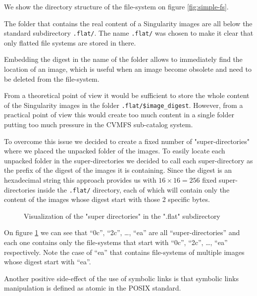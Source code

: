 We show the directory structure of the file-system on figure
\ref{fig:simple-fs}.

The folder that contains the real content of a Singularity images are all below
the standard subdirectory \texttt{.flat/}.  The name \texttt{.flat/} was chosen
to make it clear that only flatted file systems are stored in there.

Embedding the digest in the name of the folder allows to immediately find the
location of an image, which is useful when an image become obsolete and need to
be deleted from the file-system.

From a theoretical point of view it would be sufficient to store the whole
content of the Singularity images in the folder \texttt{.flat/\$image\_digest}.
However, from a practical point of view this would create too much content in a
single folder putting too much pressure in the CVMFS sub-catalog system.

To overcome this issue we decided to create a fixed number of
"super-directories" where we placed the unpacked folder of the images.  To
easily locate each unpacked folder in the super-directories we decided to call
each super-directory as the prefix of the digest of the images it is
containing. Since the digest is an hexadecimal string this approach provides us
with $16 \times 16 = 256$ fixed super-directories inside the \texttt{.flat/}
directory, each of which will contain only the content of the images whose
digest start with those 2 specific bytes.

\begin{figure}
\caption{Visualization of the "super directories" in the ".flat" subdirectory}
\label{fig:super-directories}
\end{figure}

On figure \ref{fig:super-directories} we can see that “0c”, “2c”, …, “ea” are
all “super-directories” and each one contains only the file-systems that start
with “0c”, “2c”, …, “ea” respectively.  Note the case of “ea” that contains
file-systems of multiple images whose digest start with “ea”.

Another positive side-effect of the use of symbolic links is that symbolic
links manipulation is defined as atomic in the POSIX standard.

